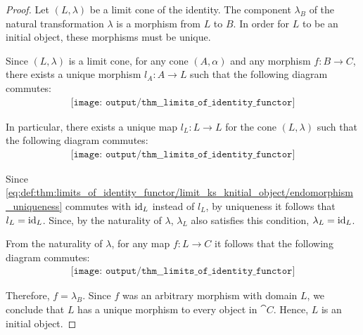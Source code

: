 \begin{proof}
   Let \( (L, \lambda) \) be a limit cone of the identity. The component \( \lambda_B \) of the natural transformation \( \lambda \) is a morphism from \( L \) to \( B \). In order for \( L \) to be an initial object, these morphisms must be unique.

  Since \( (L, \lambda) \) is a limit cone, for any cone \( (A, \alpha) \) and any morphism \( f: B \to C \), there exists a unique morphism \( l_A: A \to L \) such that the following diagram commutes:
  \begin{equation}\label{eq:def:thm:limits_of_identity_functor/limit_ks_knitial_object/limit}
    \begin{aligned}
      \texttt{[image: output/thm\_\_limits\_of\_identity\_functor]}
    \end{aligned}
  \end{equation}

  In particular, there exists a unique map \( l_L: L \to L \) for the cone \( (L, \lambda) \) such that the following diagram commutes:
  \begin{equation}\label{eq:def:thm:limits_of_identity_functor/limit_ks_knitial_object/endomorphism_uniqueness}
    \begin{aligned}
      \texttt{[image: output/thm\_\_limits\_of\_identity\_functor]}
    \end{aligned}
  \end{equation}

  Since \eqref{eq:def:thm:limits_of_identity_functor/limit_ks_knitial_object/endomorphism_uniqueness} commutes with \( \operatorname{id}_L \) instead of \( l_L \), by uniqueness it follows that \( l_L = \operatorname{id}_L \). Since, by the naturality of \( \lambda \), \( \lambda_L \) also satisfies this condition, \( \lambda_L = \operatorname{id}_L \).

  From the naturality of \( \lambda \), for any map \( f: L \to C \) it follows that the following diagram commutes:
  \begin{equation}\label{eq:def:thm:limits_of_identity_functor/limit_ks_knitial_object/morphism_uniqueness}
    \begin{aligned}
      \texttt{[image: output/thm\_\_limits\_of\_identity\_functor]}
    \end{aligned}
  \end{equation}

  Therefore, \( f = \lambda_B \). Since \( f \) was an arbitrary morphism with domain \( L \), we conclude that \( L \) has a unique morphism to every object in \( \cat{C} \). Hence, \( L \) is an initial object.
\end{proof}


